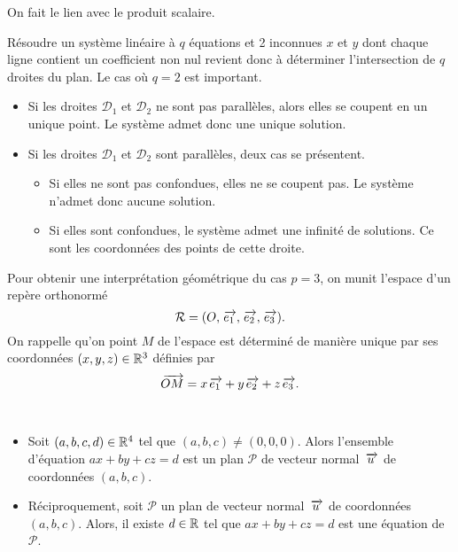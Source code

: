 \documentclass{magnolia}
\begin{document}
\begin{preuve}
On fait le lien avec le produit scalaire. 
\end{preuve}

Résoudre un système linéaire à $q$ équations et 2 inconnues $x$ et $y$ dont chaque ligne contient un coefficient non nul revient donc à déterminer l'intersection de $q$ droites du plan. Le cas où $q=2$ est important.
\begin{itemize}
\item Si les droites $\mathcal{D}_1$ et $\mathcal{D}_2$ ne sont pas parallèles, alors elles se coupent en un unique point. Le système admet donc une unique solution.
\item Si les droites $\mathcal{D}_1$ et $\mathcal{D}_2$ sont parallèles, deux cas se présentent.
\begin{itemize}
\item Si elles ne sont pas confondues, elles ne se coupent pas. Le système n'admet donc aucune solution.
\item Si elles sont confondues, le système admet une infinité de solutions. Ce sont les coordonnées des points de cette droite.
\end{itemize}
\end{itemize}


Pour obtenir une interprétation géométrique du cas $p=3$, on munit l'espace d'un repère orthonormé \[\mathcal{R}=(O,\kern 2pt\overrightarrow{\kern -2pte_1},\kern 2pt\overrightarrow{\kern -2pte_2},\kern 2pt\overrightarrow{\kern -2pte_3}).\] On rappelle qu'on point $M$ de l'espace est déterminé de manière unique par ses coordonnées $(x,y,z)\in\mathbb{R}^3$ définies par \[\kern 2pt\overrightarrow{\kern -2ptOM}=x\kern 2pt\overrightarrow{\kern -2pte_1}+y\kern 2pt\overrightarrow{\kern -2pte_2}+z\kern 2pt\overrightarrow{\kern -2pte_3}.\]

\begin{proposition}
\ 
\begin{itemize}
\item Soit $(a,b,c,d)\in\mathbb{R}^4$ tel que $(a,b,c)\neq(0,0,0)$. Alors l'ensemble d'équation $ax+by+cz=d$ est un plan $\mathcal{P}$ de vecteur normal $\kern 2pt\overrightarrow{\kern -2ptu}$ de coordonnées $(a,b,c)$.
\item Réciproquement, soit $\mathcal{P}$ un plan de vecteur normal $\kern 2pt\overrightarrow{\kern -2ptu}$ de coordonnées $(a,b,c)$. Alors, il existe $d\in\mathbb{R}$ tel que $ax+by+cz=d$ est une équation de $\mathcal{P}$.
\end{itemize}
\end{proposition}
\end{document}
